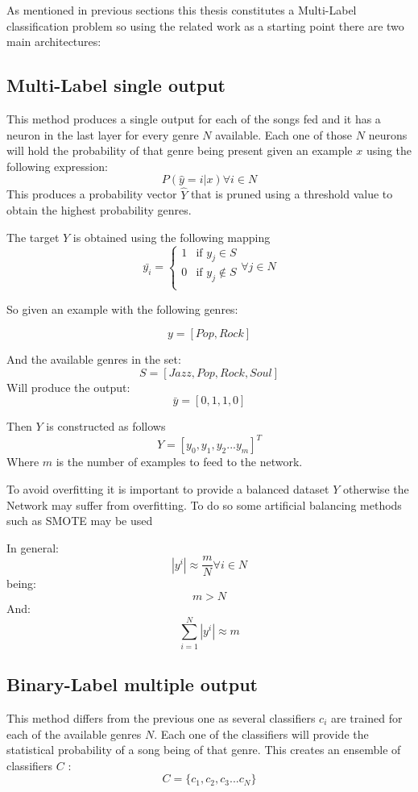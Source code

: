 As mentioned in previous sections this thesis constitutes a Multi-Label classification problem so using the related work as a starting point there are two main architectures:

\subsection{Multi-Label single output}
This method produces a single output for each of the songs fed and it has a neuron in the last layer for every genre $N$ available. Each one of those \(N\) neurons will hold the probability of that genre being present given an example \(x\) using the following expression:
$$ P(\hat{y} = i | x) \forall i \in N$$
This produces a probability vector $\hat{Y}$ that is pruned using a threshold value to obtain the highest probability genres.

The target $Y$ is obtained using the following mapping
$$
\bar{y_i} =
\begin{cases} 
    1 & \text{if } y_j \in S\\
    0 & \text{if } y_j \notin S\\
\end{cases}
\forall j \in N
$$

So given an example with the following genres:

$$ y  = [ Pop, Rock ]$$

And the available genres in the set:
$$ S  = [Jazz, Pop, Rock, Soul]$$
Will produce the output:
$$ \bar{y}  = [0, 1, 1, 0]$$

Then $Y$  is constructed as follows
$$ Y = [y_0, y_1, y_2 ... y_m]^T$$
Where $m$ is the number of examples to feed to the network.

To avoid overfitting it is important to provide a balanced dataset $Y$ otherwise the Network may suffer from overfitting.
To do so some artificial balancing methods such as SMOTE\cite{smote} may be used

In general:
$$ |y^i| \approx \frac{m}{N}   \forall i \in N $$
being:
$$ m > N $$
And:
$$ \sum_{i=1}^{N} |y^i| \approx m $$

\subsection{Binary-Label multiple output}
This method differs from the previous one as several classifiers $c_i$ are trained for each of the available genres $N$. Each one of the classifiers will provide the statistical probability of a song being of that genre.
This creates an ensemble of classifiers $C$ :
$$ C = \{c_1, c_2, c_3 ... c_N\} $$ 

